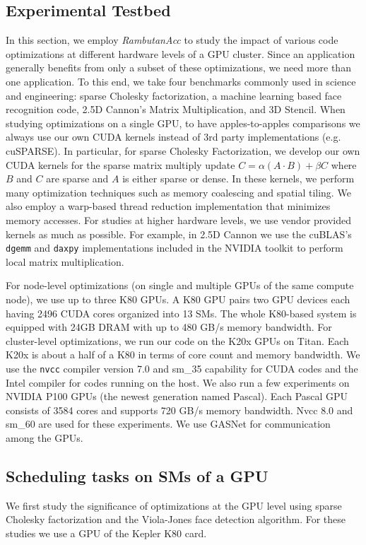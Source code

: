 \subsection{Experimental Testbed}
In this section, we employ {\em RambutanAcc} to study the impact of various code optimizations at different hardware levels of a GPU cluster.
Since an application generally benefits from only a subset of these optimizations, we need more than one application.
To this end, we take four benchmarks commonly used in science and engineering: sparse Cholesky factorization, a machine learning based face recognition code, 2.5D Cannon's Matrix Multiplication, and 3D Stencil.
When studying optimizations on a single GPU, to have apples-to-apples comparisons we always use our own CUDA kernels instead of 3rd party implementations (e.g. cuSPARSE). 
In particular, for sparse Cholesky Factorization, we develop our own CUDA kernels for the sparse matrix multiply update $C = \alpha (A \cdot B) + \beta C$ where $B$ and $C$ are sparse and $A$ is either sparse or dense.
In these kernels, we perform many optimization techniques such as memory coalescing and spatial tiling.
We also employ a warp-based thread reduction implementation that minimizes memory accesses.
For studies at higher hardware levels, we use vendor provided kernels as much as possible.
For example, in  2.5D Cannon we use the cuBLAS's {\tt dgemm} and {\tt daxpy} implementations included in the NVIDIA toolkit to perform local matrix multiplication.

For node-level optimizations (on single and multiple GPUs of the same compute node), we use up to three K80 GPUs.
A K80 GPU pairs two GPU devices each having 2496 CUDA cores organized into 13 SMs.
The whole K80-based system is equipped with 24GB DRAM with up to 480 GB/s memory bandwidth.
For cluster-level optimizations, we run our code on the K20x GPUs on Titan.
Each K20x is about a half of a K80 in terms of core count and memory bandwidth.
We use the {\tt nvcc} compiler version 7.0 and sm\_35 capability for CUDA codes and the Intel compiler for codes running on the host.
We also run a few experiments on NVIDIA P100 GPUs (the newest generation named Pascal).
Each Pascal GPU consists of 3584 cores and supports 720 GB/s memory bandwidth.
Nvcc 8.0 and sm\_60 are used for these experiments.
We use GASNet for communication among the GPUs. 


\subsection{Scheduling tasks on SMs of a GPU}
We first study the significance of optimizations at the GPU level using sparse Cholesky factorization and the Viola-Jones face detection algorithm.
For these studies we use a GPU of the Kepler K80 card.


